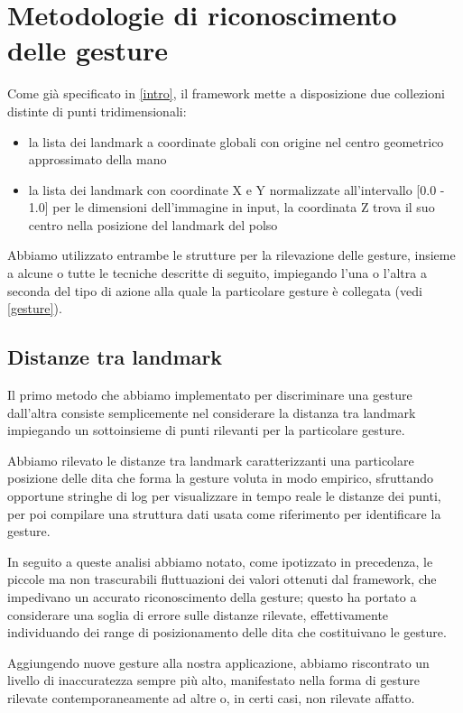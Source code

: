 \chapter{Metodologie di riconoscimento delle gesture}

Come già specificato in \ref{intro}, il framework mette a disposizione due collezioni distinte di punti tridimensionali: 
\begin{itemize}
    \item la lista dei landmark a coordinate globali con origine nel centro geometrico approssimato della mano
    \item la lista dei landmark con coordinate X e Y normalizzate all'intervallo [0.0 - 1.0] per le dimensioni dell'immagine in input, la coordinata Z trova il suo centro nella posizione del landmark del polso
\end{itemize}

\noindent Abbiamo utilizzato entrambe le strutture per la rilevazione delle gesture, insieme a alcune o tutte le tecniche descritte di seguito, impiegando l'una o l'altra a seconda del tipo di azione alla quale la particolare gesture è collegata (vedi \ref{gesture}).

\section{Distanze tra landmark}

Il primo metodo che abbiamo implementato per discriminare una gesture dall'altra consiste semplicemente nel considerare la distanza tra landmark impiegando un sottoinsieme di punti rilevanti per la particolare gesture.

Abbiamo rilevato le distanze tra landmark caratterizzanti una particolare posizione delle dita che forma la gesture voluta in modo empirico, sfruttando opportune stringhe di log per visualizzare in tempo reale le distanze dei punti, per poi compilare una struttura dati usata come riferimento per identificare la gesture.

In seguito a queste analisi abbiamo notato, come ipotizzato in precedenza, le piccole ma non trascurabili fluttuazioni dei valori ottenuti dal framework, che impedivano un accurato riconoscimento della gesture; questo ha portato a considerare una soglia di errore sulle distanze rilevate, effettivamente individuando dei range di posizionamento delle dita che costituivano le gesture.

Aggiungendo nuove gesture alla nostra applicazione, abbiamo riscontrato un livello di inaccuratezza sempre più alto, manifestato nella forma di gesture rilevate contemporaneamente ad altre o, in certi casi, non rilevate affatto.

